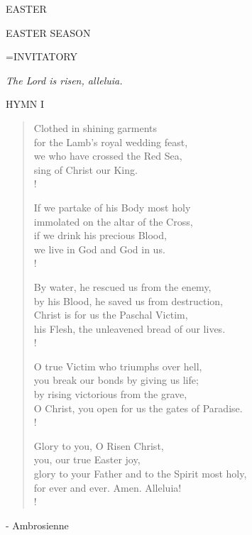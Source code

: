 \begin{center}\normalsize EASTER\\
\end{center}

EASTER SEASON

\hangindent=\parindent \small{INVITATORY}
\begin{center}
\textit{The Lord is risen, alleluia.\\}
\end{center}

\noindent\small{\uppercase{Hymn I}}\normalsize
\begin{verse}
Clothed in shining garments\\
for the Lamb's royal wedding feast,\\
we who have crossed the Red Sea,\\
sing of Christ our King.\\!

If we partake of his Body most holy\\
immolated on the altar of the Cross,\\
if we drink his precious Blood,\\
we live in God and God in us.\\!

By water, he rescued us from the enemy,\\
by his Blood, he saved us from destruction,\\
Christ is for us the Paschal Victim,\\
his Flesh, the unleavened bread of our lives.\\!

O true Victim who triumphs over hell,\\
you break our bonds by giving us life;\\
by rising victorious from the grave,\\
O Christ, you open for us the gates of Paradise.\\!

Glory to you, O Risen Christ,\\
you, our true Easter joy,\\
glory to your Father and to the Spirit most holy,\\
for ever and ever. Amen. Alleluia!\\!
\end{verse}

- Ambrosienne

